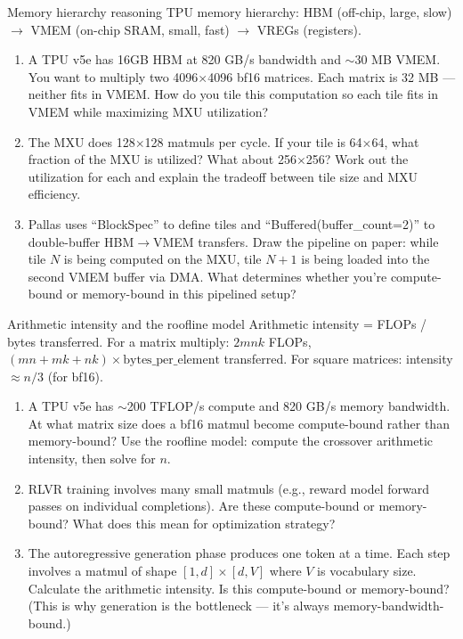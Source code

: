 \begin{thinkfirst}{Memory hierarchy reasoning}
TPU memory hierarchy: HBM (off-chip, large, slow) $\to$ VMEM (on-chip SRAM, small, fast) $\to$ VREGs (registers).

\begin{enumerate}
  \item A TPU v5e has 16GB HBM at 820 GB/s bandwidth and $\sim$30 MB VMEM. You want to multiply two 4096$\times$4096 bf16 matrices. Each matrix is 32 MB --- neither fits in VMEM. How do you tile this computation so each tile fits in VMEM while maximizing MXU utilization?

  \item The MXU does 128$\times$128 matmuls per cycle. If your tile is 64$\times$64, what fraction of the MXU is utilized? What about 256$\times$256? Work out the utilization for each and explain the tradeoff between tile size and MXU efficiency.

  \item Pallas uses ``BlockSpec'' to define tiles and ``Buffered(buffer\_count=2)'' to double-buffer HBM$\to$VMEM transfers. Draw the pipeline on paper: while tile $N$ is being computed on the MXU, tile $N+1$ is being loaded into the second VMEM buffer via DMA. What determines whether you're compute-bound or memory-bound in this pipelined setup?
\end{enumerate}
\end{thinkfirst}

\begin{thinkfirst}{Arithmetic intensity and the roofline model}
Arithmetic intensity = FLOPs / bytes transferred. For a matrix multiply: $2mnk$ FLOPs, $(mn + mk + nk) \times \text{bytes\_per\_element}$ transferred. For square matrices: intensity $\approx n/3$ (for bf16).

\begin{enumerate}
  \item A TPU v5e has $\sim$200 TFLOP/s compute and 820 GB/s memory bandwidth. At what matrix size does a bf16 matmul become compute-bound rather than memory-bound? Use the roofline model: compute the crossover arithmetic intensity, then solve for $n$.

  \item RLVR training involves many small matmuls (e.g., reward model forward passes on individual completions). Are these compute-bound or memory-bound? What does this mean for optimization strategy?

  \item The autoregressive generation phase produces one token at a time. Each step involves a matmul of shape $[1, d] \times [d, V]$ where $V$ is vocabulary size. Calculate the arithmetic intensity. Is this compute-bound or memory-bound? (This is why generation is the bottleneck --- it's always memory-bandwidth-bound.)
\end{enumerate}
\end{thinkfirst}

